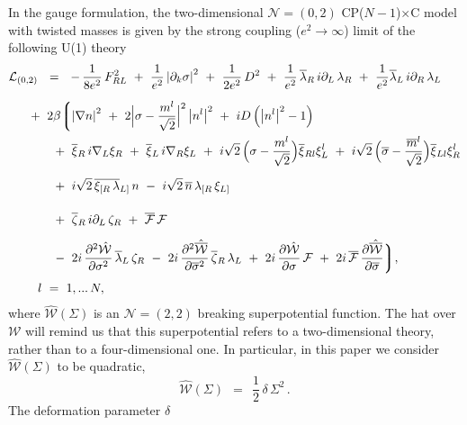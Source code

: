 \documentclass[12pt]{article}
\newcommand{\ntwot}{${\mathcal N}= \left(2,2\right) $ }
\newcommand{\ntwoo}{${\mathcal N}= \left(0,2\right) $ }
\newcommand{\p}{\partial}
\newcommand{\wt}{\widetilde}
\newcommand{\ov}{\overline}
\newcommand{\mc}[1]{\mathcal{#1}}
\newcommand{\bxir}{\ov{\xi}{}_R}
\newcommand{\bxil}{\ov{\xi}{}_L}
\newcommand{\xir}{\xi_R}
\newcommand{\xil}{\xi_L}
\newcommand{\bzr}{\ov{\zeta}{}_R}
\newcommand{\zr}{\zeta_R}
\newcommand{\nbar}{\ov{n}}
\newcommand{\CPC}{CP($N-1$)$\times$C }
\newcommand{\lar}{\lambda_R}
\newcommand{\lal}{\lambda_L}
\newcommand{\blar}{\ov{\lambda}{}_R}
\newcommand{\blal}{\ov{\lambda}{}_L}
\newcommand{\tgamma}{\wt{\gamma}}
\newcommand{\ff}{\mc{F}}
\newcommand{\bff}{\ov{\mc{F}}}
\begin{document}
In the gauge formulation, the two-dimensional
\ntwoo \CPC  model with twisted
masses  is given by the strong coupling ($ e^2\to\infty $) limit  of
the following U(1) theory
\begin{align}
\label{sigma_full}
% 
\notag
 	\mc{L}_\text{(0,2)} & ~~=~~
	-\,\frac{1}{8e^2}\,F_{RL}^2  ~+~ \frac{1}{e^2} \left|\p_k \sigma\right|^2 
	~+~ \frac{1}{2e^2}\, D^2
	~+~ \frac{1}{e^2}\, \blar\, i\p_L\, \lar  ~+~  \frac{1}{e^2} \blal\, i\p_R\, \lal
	\\[2mm]
%
\notag
	&
	\hspace{-0.4cm}
	~+~ 2\beta \biggl \lgroup
	\left| \nabla n \right|^2  ~+~ 2 \Bigl| \sigma - 
	\frac{m^l}{\sqrt{2}} \Bigr|^2 \left| n^l \right|^2
	~+~ iD \left( \left|n^l \right|^2 - 1 \right)
	\\
%
\notag
	&
	\hspace{-0.4cm}\phantom{2\beta\lgroup}
	~+~ \bxir\, i\nabla_L \xir  ~+~ \bxil\, i\nabla_R \xil ~+~
	i\sqrt{2}\, \Bigl( \sigma - \frac{m^l}{\sqrt{2}} \Bigr) \ov{\xi}{}_{Rl} \xi_L^l
	~+~ i\sqrt{2}\, \Bigl( \ov{\sigma} - \frac{\ov{m}{}^l}{\sqrt{2}} \Bigr) \ov{\xi}{}_{Ll} \xi_R^l
	\\[2mm]
%
	&
	\hspace{-0.4cm}\phantom{2\beta\lgroup}
	~+~ i\sqrt{2}\, \ov{\xi_{[R}\, \lambda}{}_{L]}\, n
	~-~ i\sqrt{2}\, \nbar\,  \lambda_{[R}\, \xi_{L]}
	\\[2mm]
%
\notag
	&
	\hspace{-0.4cm}\phantom{2\beta\lgroup}
	~+~ \bzr\, i\p_L\, \zr   ~+~   \bff\, \ff
	\\
%
\notag
	&
	\hspace{-0.4cm}\phantom{2\beta\lgroup}
	~-~ 2i\, \frac{\p^2 \hat{\mc{W}}}{\p \sigma^2}\, \blal\, \zr
	~-~ 2i\, \frac{\p^2 \hat{\ov{\mc{W}}}}{\p \ov{\sigma}{}^2}\, \bzr\, \lal
	~+~ 2i\, \frac{\p \hat{\mc{W}}}{\p \sigma}\, \ff
	~+~ 2i\, \bff\, \frac{\p \hat{\ov{\mc{W}}}}{\p \ov{\sigma}}
	\biggr\rgroup ,
	\\[1mm]
%
\notag
	&
	l~=~1,...\,N,
\end{align}
	where $ \hat{\mc{W}}(\Sigma) $ is an   \ntwot breaking superpotential 
	function. The hat over ${\mc{W}}$ will remind us that
	this superpotential refers to a two-dimensional theory, rather than to a four-dimensional one.
	In particular, in this paper we consider
$ \hat{\mc{W}}(\Sigma) $ to be   quadratic,
\[
	\hat{\mc{W}}(\Sigma) ~~=~~ \frac{1}{2}\, \delta\, \Sigma^2\,.
\]
The deformation parameter $\delta$ 
\end{document}
